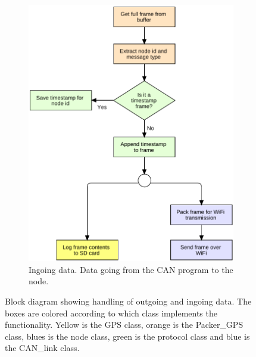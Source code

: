 \begin{figure}[!h]
\begin{subfigure}{0.52\textwidth}
        \includegraphics[width=1\textwidth]{graphics/FlowChart_CANFrameProcess}
        \caption{Ingoing data. Data going from the CAN program to the node.}
        \label{fig:filter_2}
    \end{subfigure}
        \caption{Block diagram showing handling of outgoing and ingoing data. The boxes are colored according to which class implements the functionality. Yellow is the GPS class, orange is the Packer\_GPS class, blues is the node class, green is the protocol class and blue is the CAN\_link class.}
           \label{fig:filter_fulll}
\end{figure}
